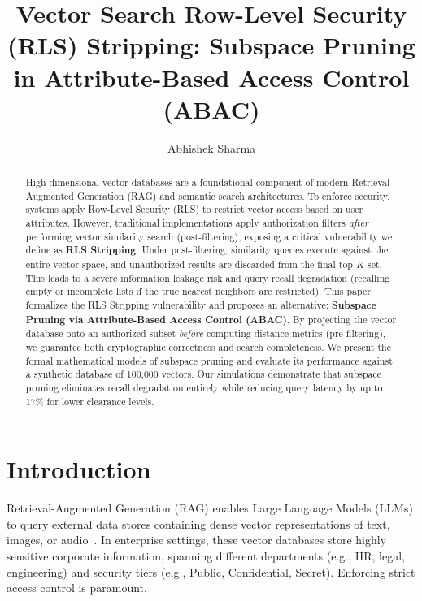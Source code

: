 \documentclass[sigconf]{acmart}
\begin{document}
\title{Vector Search Row-Level Security (RLS) Stripping: Subspace Pruning in Attribute-Based Access Control (ABAC)}

\author{Abhishek Sharma}

\begin{abstract}
High-dimensional vector databases are a foundational component of modern Retrieval-Augmented Generation (RAG) and semantic search architectures. To enforce security, systems apply Row-Level Security (RLS) to restrict vector access based on user attributes. However, traditional implementations apply authorization filters \textit{after} performing vector similarity search (post-filtering), exposing a critical vulnerability we define as \textbf{RLS Stripping}. Under post-filtering, similarity queries execute against the entire vector space, and unauthorized results are discarded from the final top-$K$ set. This leads to a severe information leakage risk and query recall degradation (recalling empty or incomplete lists if the true nearest neighbors are restricted). This paper formalizes the RLS Stripping vulnerability and proposes an alternative: \textbf{Subspace Pruning via Attribute-Based Access Control (ABAC)}. By projecting the vector database onto an authorized subset \textit{before} computing distance metrics (pre-filtering), we guarantee both cryptographic correctness and search completeness. We present the formal mathematical models of subspace pruning and evaluate its performance against a synthetic database of 100,000 vectors. Our simulations demonstrate that subspace pruning eliminates recall degradation entirely while reducing query latency by up to 17\% for lower clearance levels.
\end{abstract}


\maketitle

\section{Introduction}
Retrieval-Augmented Generation (RAG) enables Large Language Models (LLMs) to query external data stores containing dense vector representations of text, images, or audio~\cite{lewis2020retrieval}. In enterprise settings, these vector databases store highly sensitive corporate information, spanning different departments (e.g., HR, legal, engineering) and security tiers (e.g., Public, Confidential, Secret). Enforcing strict access control is paramount.
\end{document}
